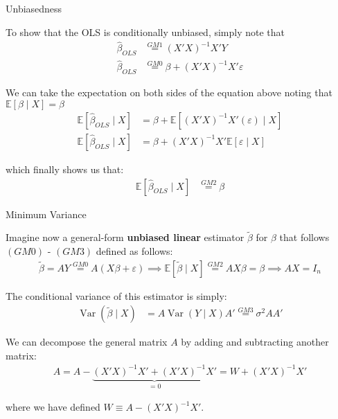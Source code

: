 \begin{frame}{Unbiasedness}

    To show that the OLS is conditionally unbiased, simply note that
    \begin{align*}
        \hat{\beta}_{OLS} &\overset{GM1}{=} (X'X)^{-1} X'Y
        \\
        \hat{\beta}_{OLS} &\overset{GM0}{=} \beta + (X'X)^{-1} X' \varepsilon
    \end{align*}
    
    We can take the expectation on both sides of the equation above noting that $\mathbb{E} [\beta \mid X] = \beta$
    \begin{align*}
        \mathbb{E} [ \hat{\beta}_{OLS} \mid X] &= \beta + \mathbb{E} [ (X'X)^{-1} X'(\varepsilon) \mid X]
        \\
        \mathbb{E} [ \hat{\beta}_{OLS} \mid X] &= \beta + (X'X)^{-1} X' \mathbb{E} [ \varepsilon \mid X]
    \end{align*}
    
    which finally shows us that:
    \begin{align*}
        \mathbb{E} [ \hat{\beta}_{OLS} \mid X] &\overset{GM2}{=} \beta
    \end{align*}

\end{frame}

\begin{frame}{Minimum Variance}

    Imagine now a general-form \textbf{unbiased linear} estimator $\tilde{\beta}$ for $\beta$ that follows $(GM0)$ - $(GM3)$ defined as follows:
    \begin{align*}
        \tilde{\beta} = AY \overset{GM0}{=} A(X \beta + \varepsilon) \implies \mathbb{E}[\tilde{\beta} \mid X] \overset{GM2}{=} AX \beta = \beta \implies AX = I_n
    \end{align*}
    
    The conditional variance of this estimator is simply:
    \begin{align*}
        \operatorname{Var} (\tilde{\beta} \mid X) &= A \operatorname{Var} ( Y \mid X) A' \overset{GM3}{=} \sigma^2 A A'
    \end{align*}
    
    We can decompose the general matrix $A$ by adding and subtracting another matrix:
    \begin{align*}
        A = A - \underbrace{ (X'X)^{-1} X' + (X'X)^{-1} X'}_{=0} = W + (X'X)^{-1} X'
    \end{align*}

    where we have defined $W \equiv A - (X'X)^{-1} X'$.

\end{frame}

